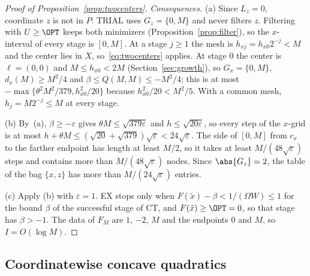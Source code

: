 \begin{proof}[Proof of Proposition~\ref{prop:twocenters}]
\emph{Consequences.} (a) Since $L_z=0$, coordinate $z$ is not in $P$: TRIAL
uses $G_z=\{0,M\}$ and never filters $z$. Filtering with $U\ge\OPT$ keeps
both minimizers (Proposition~\ref{prop:filter}), so the $x$-interval of every
stage is $[0,M]$. At a stage $j\ge1$ the mesh is $h_{xj}=h_{x0}2^{-j}<M$ and
the center lies in $X$, so~\eqref{eq:twocenters} applies. At stage $0$ the
center is $\ell=(0,0)$ and $M\le h_{x0}<2M$ (Section~\ref{sec:growth}), so
$G_x=\{0,M\}$, $d_x(M)\ge M^2/4$ and $\beta\le Q(M,M)\le-M^2/4$; this is at
most $-\max\{\theta^2M^2/379,h_{x0}^2/20\}$ because $h_{x0}^2/20<M^2/5$.
With a common mesh, $h_j=M2^{-j}\le M$ at every stage.

(b) By~(a), $\beta\ge-\varepsilon$ gives $\theta M\le\sqrt{379\varepsilon}$
and $h\le\sqrt{20\varepsilon}$, so every step of the $x$-grid is at most
$h+\theta M\le(\sqrt{20}+\sqrt{379})\sqrt\varepsilon<24\sqrt\varepsilon$. The
side of $[0,M]$ from $c_x$ to the farther endpoint has length at least $M/2$,
so it takes at least $M/(48\sqrt\varepsilon)$ steps and contains more than
$M/(48\sqrt\varepsilon)$ nodes. Since $\abs{G_z}=2$, the table of the bag
$\{x,z\}$ has more than $M/(24\sqrt\varepsilon)$ entries.

(c) Apply (b) with $\varepsilon=1$. EX stops only when
$F(\tilde x)-\beta<1/(\Omega W)\le1$ for the bound $\beta$ of the successful
stage of CT, and $F(\tilde x)\ge\OPT=0$, so that stage has $\beta>-1$. The
data of $F_M$ are $1$, $-2$, $M$ and the endpoints $0$ and $M$, so
$I=O(\log M)$.
\end{proof}

\subsection{Coordinatewise concave quadratics}

